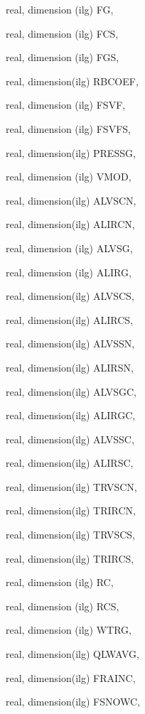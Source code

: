 {\begin{DoxyParamCaption}
\item[{real, dimension    (ilg)}]{F\+G, }
\item[{real, dimension   (ilg)}]{F\+C\+S, }
\item[{real, dimension   (ilg)}]{F\+G\+S, }
\item[{real, dimension(ilg)}]{R\+B\+C\+O\+E\+F, }
\item[{real, dimension  (ilg)}]{F\+S\+V\+F, }
\item[{real, dimension (ilg)}]{F\+S\+V\+F\+S, }
\item[{real, dimension(ilg)}]{P\+R\+E\+S\+S\+G, }
\item[{real, dimension  (ilg)}]{V\+M\+O\+D, }
\item[{real, dimension(ilg)}]{A\+L\+V\+S\+C\+N, }
\item[{real, dimension(ilg)}]{A\+L\+I\+R\+C\+N, }
\item[{real, dimension (ilg)}]{A\+L\+V\+S\+G, }
\item[{real, dimension (ilg)}]{A\+L\+I\+R\+G, }
\item[{real, dimension(ilg)}]{A\+L\+V\+S\+C\+S, }
\item[{real, dimension(ilg)}]{A\+L\+I\+R\+C\+S, }
\item[{real, dimension(ilg)}]{A\+L\+V\+S\+S\+N, }
\item[{real, dimension(ilg)}]{A\+L\+I\+R\+S\+N, }
\item[{real, dimension(ilg)}]{A\+L\+V\+S\+G\+C, }
\item[{real, dimension(ilg)}]{A\+L\+I\+R\+G\+C, }
\item[{real, dimension(ilg)}]{A\+L\+V\+S\+S\+C, }
\item[{real, dimension(ilg)}]{A\+L\+I\+R\+S\+C, }
\item[{real, dimension(ilg)}]{T\+R\+V\+S\+C\+N, }
\item[{real, dimension(ilg)}]{T\+R\+I\+R\+C\+N, }
\item[{real, dimension(ilg)}]{T\+R\+V\+S\+C\+S, }
\item[{real, dimension(ilg)}]{T\+R\+I\+R\+C\+S, }
\item[{real, dimension    (ilg)}]{R\+C, }
\item[{real, dimension   (ilg)}]{R\+C\+S, }
\item[{real, dimension  (ilg)}]{W\+T\+R\+G, }
\item[{real, dimension(ilg)}]{Q\+L\+W\+A\+V\+G, }
\item[{real, dimension(ilg)}]{F\+R\+A\+I\+N\+C, }
\item[{real, dimension(ilg)}]{F\+S\+N\+O\+W\+C, }

\end{DoxyParamCaption}}
